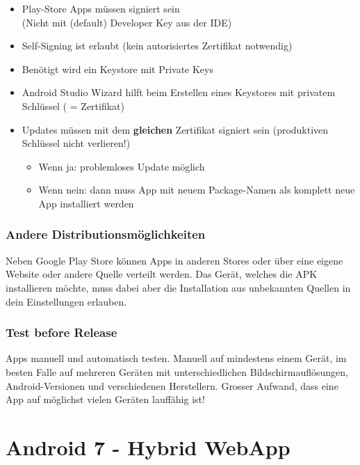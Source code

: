 \documentclass[a4paper]{article}
\begin{document}
		\begin{itemize}
			
			\item Play-Store Apps müssen signiert sein\\ 
			(Nicht mit (default) Developer Key aus der IDE)
			
			\item Self-Signing ist erlaubt (kein autorisiertes Zertifikat notwendig)
			
			\item Benötigt wird ein Keystore mit Private Keys
			
			\item Android Studio Wizard hilft beim Erstellen eines Keystores mit privatem Schlüssel ( = Zertifikat)
			
			\item Updates müssen mit dem \textbf{gleichen} Zertifikat signiert sein (produktiven Schlüssel nicht verlieren!)
			\begin{itemize}
				\item Wenn ja: problemloses Update möglich
				\item Wenn nein: dann muss App mit neuem Package-Namen als komplett neue App installiert werden
			\end{itemize}
			
		\end{itemize}
	
		\subsubsection{Andere Distributionsmöglichkeiten}
		
		Neben Google Play Store können Apps in anderen Stores oder über eine eigene Website oder andere Quelle verteilt werden. Das Gerät, welches die APK installieren möchte, muss dabei aber die Installation aus unbekannten Quellen in dein Einstellungen erlauben.
		
		\subsubsection{Test before Release}
		
		Apps manuell und automatisch testen. 
		Manuell auf mindestens einem Gerät, im besten Falle auf mehreren Geräten mit unterschiedlichen Bildschirmauflösungen, Android-Versionen und verschiedenen Herstellern.
		Grosser Aufwand, dass eine App auf möglichst vielen Geräten lauffähig ist!
	
\newpage
\section{Android 7 - Hybrid WebApp}
\end{document}
